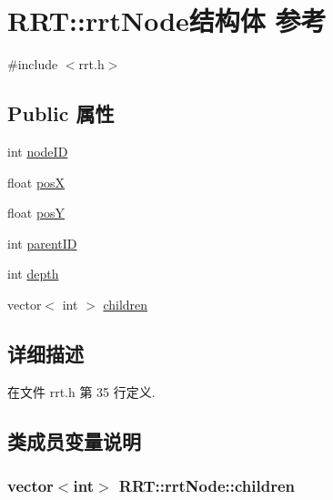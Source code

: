 \hypertarget{structRRT_1_1rrtNode}{\section{R\-R\-T\-:\-:rrt\-Node结构体 参考}
\label{structRRT_1_1rrtNode}
}


{\ttfamily \#include $<$rrt.\-h$>$}

\subsection*{Public 属性}
\begin{DoxyCompactItemize}
\item 
int \hyperlink{structRRT_1_1rrtNode_aa8adf5b50e1a2a466771ae3af56b1658}{node\-I\-D}
\item 
float \hyperlink{structRRT_1_1rrtNode_a4c2096fa1d719cf2aa49cf21916a5a4b}{pos\-X}
\item 
float \hyperlink{structRRT_1_1rrtNode_a219cf78a0f5689bc84744df52c37e84d}{pos\-Y}
\item 
int \hyperlink{structRRT_1_1rrtNode_a9f5b9bfca61e25fe7f80d361ed7996ff}{parent\-I\-D}
\item 
int \hyperlink{structRRT_1_1rrtNode_ab20e6f5be075c8feed605c935924df30}{depth}
\item 
vector$<$ int $>$ \hyperlink{structRRT_1_1rrtNode_af387d6fb3b755400a7678b24a84508d7}{children}
\end{DoxyCompactItemize}


\subsection{详细描述}


在文件 rrt.\-h 第 35 行定义.



\subsection{类成员变量说明}
\hypertarget{structRRT_1_1rrtNode_af387d6fb3b755400a7678b24a84508d7}{
\subsubsection[{children}]{\setlength{\rightskip}{0pt plus 5cm}vector$<$int$>$ R\-R\-T\-::rrt\-Node\-::children}}\label{structRRT_1_1rrtNode_af387d6fb3b755400a7678b24a84508d7}


